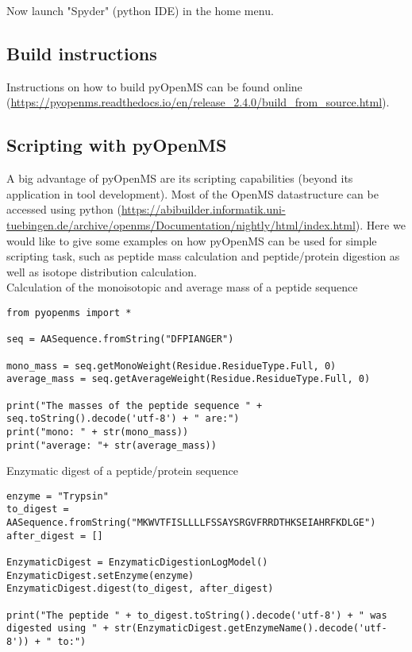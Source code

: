 {\noindent  Now launch "Spyder" (python IDE) in the home menu.

\subsection{Build instructions}
Instructions on how to build pyOpenMS can be found online (\url{https://pyopenms.readthedocs.io/en/release_2.4.0/build_from_source.html}).

\subsection{Scripting with pyOpenMS}
A big advantage of pyOpenMS are its scripting capabilities (beyond its application in tool development). Most of the OpenMS datastructure can be accessed using python (\url{https://abibuilder.informatik.uni-tuebingen.de/archive/openms/Documentation/nightly/html/index.html}). Here we would like to give some examples on how pyOpenMS can be used for simple scripting task, such as peptide mass calculation and peptide/protein digestion as well as isotope distribution calculation. \\

\noindent Calculation of the monoisotopic and average mass of a peptide sequence 
\begin{code}
\begin{verbatim}
from pyopenms import *

seq = AASequence.fromString("DFPIANGER")

mono_mass = seq.getMonoWeight(Residue.ResidueType.Full, 0)
average_mass = seq.getAverageWeight(Residue.ResidueType.Full, 0)

print("The masses of the peptide sequence " + seq.toString().decode('utf-8') + " are:")
print("mono: " + str(mono_mass))
print("average: "+ str(average_mass))
\end{verbatim}
\end{code}

\noindent Enzymatic digest of a peptide/protein sequence 
\begin{code}
\begin{verbatim}
enzyme = "Trypsin"
to_digest = AASequence.fromString("MKWVTFISLLLLFSSAYSRGVFRRDTHKSEIAHRFKDLGE")
after_digest = []

EnzymaticDigest = EnzymaticDigestionLogModel()
EnzymaticDigest.setEnzyme(enzyme)
EnzymaticDigest.digest(to_digest, after_digest)

print("The peptide " + to_digest.toString().decode('utf-8') + " was digested using " + str(EnzymaticDigest.getEnzymeName().decode('utf-8')) + " to:")


\end{verbatim}
\end{code}}
